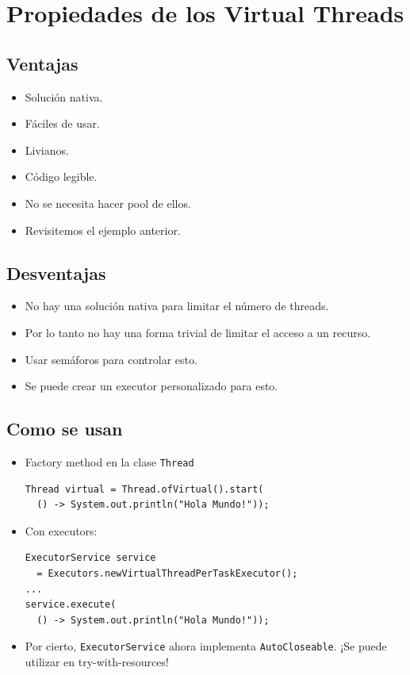 \documentclass{presentacion}
\begin{document}
\section{Propiedades de los Virtual Threads}
\subsection{Ventajas}
\begin{frame}
 \begin{itemize}[<+->]
  \item Solución nativa.
  \item Fáciles de usar.
  \item Livianos.
  \item Código legible.
  \item No se necesita hacer pool de ellos.
  \item Revisitemos el ejemplo anterior.
 \end{itemize}

\end{frame}

\subsection{Desventajas}
\begin{frame}
 \begin{itemize}[<+->]
  \item No hay una solución nativa para limitar el número de threads.
  \item Por lo tanto no hay una forma trivial de limitar el acceso a un recurso.
  \item Usar semáforos para controlar esto.
  \item Se puede crear un executor personalizado para esto.
 \end{itemize}
\end{frame}

\subsection{Como se usan}
\begin{frame}[fragile]
    \begin{itemize}
        \item Factory method en la clase \texttt{Thread}
        \begin{verbatim}
Thread virtual = Thread.ofVirtual().start(
  () -> System.out.println("Hola Mundo!"));
        \end{verbatim}
        \item Con executors:
        \begin{verbatim}
ExecutorService service 
  = Executors.newVirtualThreadPerTaskExecutor();
...
service.execute( 
  () -> System.out.println("Hola Mundo!"));
        \end{verbatim}
        \item Por cierto, \texttt{ExecutorService} ahora implementa \texttt{AutoCloseable}.
        ¡Se puede utilizar en try-with-resources!
    \end{itemize}
\end{frame}
\end{document}
